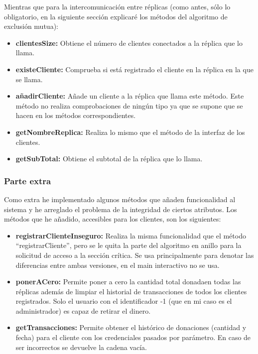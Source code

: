 \documentclass{article}
\begin{document}
Mientras que para la intercomunicación entre réplicas (como antes, sólo lo obligatorio, en la siguiente sección explicaré los métodos del algoritmo de exclusión mutua):

\begin{itemize}
    \item \textbf{clientesSize: }Obtiene el número de clientes conectados a la réplica que lo llama.
    \item \textbf{existeCliente: }Comprueba si está registrado el cliente en la réplica en la que se llama.
    \item \textbf{añadirCliente: }Añade un cliente a la réplica que llama este método. Este método no realiza comprobaciones de ningún tipo ya que se supone que se hacen en los métodos correspondientes.
    \item \textbf{getNombreReplica: }Realiza lo mismo que el método de la interfaz de los clientes.
    \item \textbf{getSubTotal: }Obtiene el subtotal de la réplica que lo llama.
\end{itemize}

\subsubsection{Parte extra}
Como extra he implementado algunos métodos que añaden funcionalidad al sistema y he arreglado el problema de la integridad de ciertos atributos. Los métodos que he añadido, accesibles para los clientes, son los siguientes:

\begin{itemize}
    \item \textbf{registrarClienteInseguro: }Realiza la misma funcionalidad que el método ``registrarCliente'', pero se le quita la parte del algoritmo en anillo para la solicitud de acceso a la sección crítica. Se usa principalmente para denotar las diferencias entre ambas versiones, en el main interactivo no se usa.
    \item \textbf{ponerACero: }Permite poner a cero la cantidad total donadaen todas las réplicas además de limpiar el historial de transacciones de todos los clientes registrados. Solo el usuario con el identificador -1 (que en mi caso es el administrador) es capaz de retirar el dinero.
    \item \textbf{getTransacciones: }Permite obtener el histórico de donaciones (cantidad y fecha) para el cliente con los credenciales pasados por parámetro. En caso de ser incorrectos se devuelve la cadena vacía.
\end{itemize}
\end{document}
